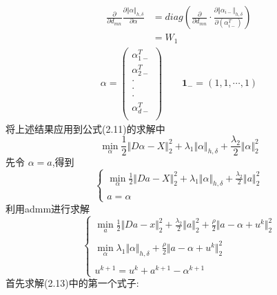 \documentclass[245.0pt]{article}
\begin{document}
\begin{align*}
\frac{\partial}{\partial d_{mn}} \frac{\partial \Vert \alpha \Vert_{h,\delta}}{\partial \alpha} &= diag \left(\frac{\partial}{\partial d_{mn}} \cdot \frac{\partial\Vert\alpha_{i-}\Vert_{h,\delta}}{\partial (\alpha_{i-}^T)} \right)\\
&= W_1 \tag{2.10}
\end{align*}
%
\begin{gather*}
\alpha = 
\begin{pmatrix}
\alpha_{1-}^T\\
\alpha_{2-}^T\\
\cdot\\
\cdot\\
\cdot\\
\alpha_{d-}^T\\
\end{pmatrix}
\qquad \boldsymbol{1_{-}} = (1,1,\cdots,1) 
\end{gather*}
将上述结果应用到公式(2.11)的求解中
\begin{equation*}
\min \limits_{\alpha} \frac{1}{2}\Vert D \alpha - X \Vert_{2}^{2} + \lambda_{1}\Vert \alpha \Vert_{h,\delta} + \frac{\lambda_{2}}{2}\Vert \alpha \Vert_{2}^{2} \tag{2.11}
\end{equation*}
% 
先令 $\alpha = a$,得到
\begin{equation*}
\begin{cases}
\min \limits_{\alpha} \frac{1}{2}\Vert Da - X \Vert_{2}^{2} + \lambda_{1} \Vert \alpha \Vert_{h,\delta} + \frac{\lambda_{2}}{2}\Vert a \Vert_{2}^{2}\\
\tag{2.12} \\
a = \alpha
\end{cases}
\end{equation*}
利用admm进行求解
\begin{equation*}
\begin{cases}
\min \limits_{a} \frac{1}{2}\Vert Da - x \Vert_{2}^{2} + \frac{\lambda_{2}}{2}\Vert a \Vert_{2}^{2} + \frac{\rho}{2}\Vert a - \alpha + u^{k} \Vert_{2}^{2}\\
\\
\min \limits_{\alpha} \lambda_{1} \Vert \alpha \Vert_{h,\delta} + \frac{\rho}{2}\Vert a - \alpha + u^{k} \Vert_{2}^{2}\\
\\
u^{k+1} = u^{k} + a^{k+1} - \alpha^{k+1}
\end{cases} \tag{2.13}
\end{equation*}
首先求解(2.13)中的第一个式子:
\end{document}
